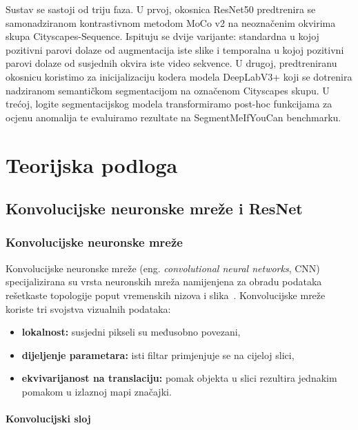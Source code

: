 \documentclass[diplomskirad]{fer}
\begin{document}
Sustav se sastoji od triju faza. U prvoj, okosnica ResNet50 
predtrenira se samonadziranom kontrastivnom metodom MoCo v2 na 
neoznačenim okvirima skupa Cityscapes-Sequence. Ispituju se dvije 
varijante: standardna u kojoj pozitivni parovi dolaze od augmentacija 
iste slike i temporalna u kojoj pozitivni parovi dolaze od susjednih 
okvira iste video sekvence. U drugoj, predtreniranu okosnicu 
koristimo za inicijalizaciju kodera modela DeepLabV3+ koji se 
dotrenira nadziranom semantičkom segmentacijom na označenom Cityscapes 
skupu. U trećoj, logite segmentacijskog modela transformiramo 
post-hoc funkcijama za ocjenu anomalija te evaluiramo rezultate na 
SegmentMeIfYouCan benchmarku.


\chapter{Teorijska podloga}
\label{pog:teorijska_podloga}



\section{Konvolucijske neuronske mreže i ResNet}
\label{sec:cnn_resnet}

\subsection{Konvolucijske neuronske mreže}

Konvolucijske neuronske mreže (eng. \textit{convolutional neural networks}, CNN) specijalizirana su vrsta neuronskih mreža namijenjena za obradu podataka rešetkaste topologije poput vremenskih nizova i slika~\cite{goodfellow2016deep}. Konvolucijske mreže koriste tri svojstva vizualnih podataka:

\begin{itemize}
	\item \textbf{lokalnost:} susjedni pikseli su međusobno povezani,
	\item \textbf{dijeljenje parametara:} isti filtar primjenjuje se na cijeloj slici,
	\item \textbf{ekvivarijanost na translaciju:} pomak objekta u slici rezultira jednakim pomakom u izlaznoj mapi značajki.
\end{itemize}

\subsubsection{Konvolucijski sloj}
\end{document}
